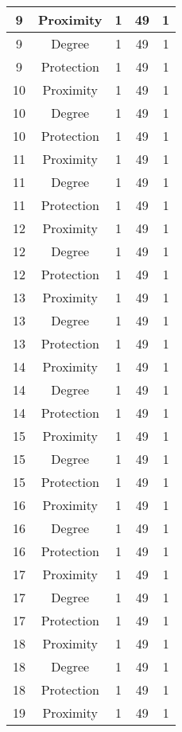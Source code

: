 \documentclass[results.tex]{subfiles}
\begin{document}
\begin{center}
\begin{tabular}{| c || c | c | c | c |}
    \hline
    9 & Proximity & 1 & 49 & 1 \\ 
    \hline
    9 & Degree & 1 & 49 & 1 \\ 
    \hline
    9 & Protection & 1 & 49 & 1 \\ 
    \hline
    10 & Proximity & 1 & 49 & 1 \\ 
    \hline
    10 & Degree & 1 & 49 & 1 \\ 
    \hline
    10 & Protection & 1 & 49 & 1 \\ 
    \hline
    11 & Proximity & 1 & 49 & 1 \\ 
    \hline
    11 & Degree & 1 & 49 & 1 \\ 
    \hline
    11 & Protection & 1 & 49 & 1 \\ 
    \hline
    12 & Proximity & 1 & 49 & 1 \\ 
    \hline
    12 & Degree & 1 & 49 & 1 \\ 
    \hline
    12 & Protection & 1 & 49 & 1 \\ 
    \hline
    13 & Proximity & 1 & 49 & 1 \\ 
    \hline
    13 & Degree & 1 & 49 & 1 \\ 
    \hline
    13 & Protection & 1 & 49 & 1 \\ 
    \hline
    14 & Proximity & 1 & 49 & 1 \\ 
    \hline
    14 & Degree & 1 & 49 & 1 \\ 
    \hline
    14 & Protection & 1 & 49 & 1 \\ 
    \hline
    15 & Proximity & 1 & 49 & 1 \\ 
    \hline
    15 & Degree & 1 & 49 & 1 \\ 
    \hline
    15 & Protection & 1 & 49 & 1 \\ 
    \hline
    16 & Proximity & 1 & 49 & 1 \\ 
    \hline
    16 & Degree & 1 & 49 & 1 \\ 
    \hline
    16 & Protection & 1 & 49 & 1 \\ 
    \hline
    17 & Proximity & 1 & 49 & 1 \\ 
    \hline
    17 & Degree & 1 & 49 & 1 \\ 
    \hline
    17 & Protection & 1 & 49 & 1 \\ 
    \hline
    18 & Proximity & 1 & 49 & 1 \\ 
    \hline
    18 & Degree & 1 & 49 & 1 \\ 
    \hline
    18 & Protection & 1 & 49 & 1 \\ 
    \hline
    19 & Proximity & 1 & 49 & 1 \\ 

\end{tabular}
\end{center}
\end{document}
